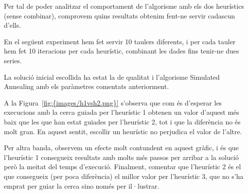 
Per tal de poder analitzar el comportament de l'algorisme amb els dos heurístics (sense combinar), comprovem quins resultats obtenim fent-ne servir cadascun d'ells.

En el següent experiment hem fet servir 10 taulers diferents, i per cada tauler hem fet 10 iteracions per cada heurístic, combinant les dades fins tenir-ne dues series.

La solució inicial escollida ha estat la de qualitat i l'algorisme Simulated Annealing amb els paràmetres comentats anteriorment.



A la Figura~\ref{fig:{images/h1vsh2.png}} s'observa que com és d'esperar les execucions amb la cerca guiada per l'heurístic 1 obtenen un valor d'aquest més baix que les que han estat guiades per l'heurístic 2, tot i que la diferència no és molt gran. En aquest sentit, escollir un heurístic no perjudica el valor de l'altre.

Per altra banda, observem un efecte molt contundent en aquest gràfic, i és que l'heurístic 1 consegueix resultats amb molts més passos per arribar a la solució però la meitat del temps d'execució. Finalment, comentar que l'heurístic 2 és el que consegueix (per poca diferència) el millor valor per l'heurístic 3, que no s'ha emprat per guiar la cerca sino només per il·lustrar.
